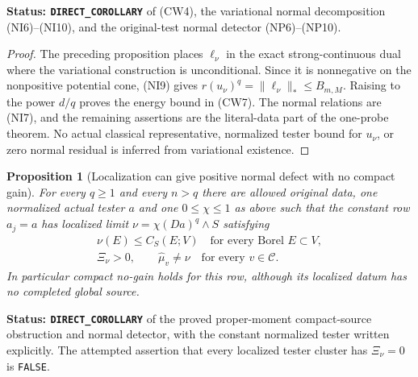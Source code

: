 \documentclass[11pt,a4paper]{article}
\numberwithin{equation}{section}
\newtheorem{proposition}[theorem]{Proposition}
\theoremstyle{definition}
\theoremstyle{remark}
\begin{document}
\noindent\textbf{Status: \texttt{DIRECT\_COROLLARY}} of
(CW4), the variational normal decomposition (NI6)--(NI10),
and the original-test normal detector (NP6)--(NP10).

\begin{proof}
The preceding proposition places $\ell_\nu$ in the exact
strong-continuous dual where the variational construction is
unconditional. Since it is nonnegative on the nonpositive
potential cone, (NI9) gives
$r(u_\nu)^q=\|\ell_\nu\|_*\leq B_{m,M}$.
Raising to the power $d/q$ proves the energy bound in (CW7).
The normal relations are (NI7), and the remaining assertions
are the literal-data part of the one-probe theorem. No actual
classical representative, normalized tester bound for $u_\nu$,
or zero normal residual is inferred from variational existence.
\end{proof}

\begin{proposition}[Localization can give positive normal defect with no compact gain]
\label{prop:r12-localized-normal-defect-not-capacity-gate}
For every $q\geq1$ and every $n>q$ there are allowed original
data, one normalized actual tester $a$ and one $0\leq\chi\leq1$
as above such that the constant row $a_j=a$ has localized limit
$\nu=\chi(Da)^q\wedge S$ satisfying
\[
 \begin{gathered}
       \nu(E)\leq C_S(E;V)\quad\text{for every Borel }E\subset V,\\
       \Xi_\nu>0,
       \qquad \widehat\mu_v\ne\nu\quad\text{for every }v\in\mathscr C.
 \end{gathered}
 \tag{CW10}
\]
In particular compact no-gain holds for this row, although its
localized datum has no completed global source.
\end{proposition}

\noindent\textbf{Status: \texttt{DIRECT\_COROLLARY}}
of the proved proper-moment compact-source obstruction and
normal detector, with the constant normalized tester written
explicitly. The attempted assertion that every localized tester
cluster has $\Xi_\nu=0$ is \texttt{FALSE}.
\end{document}
